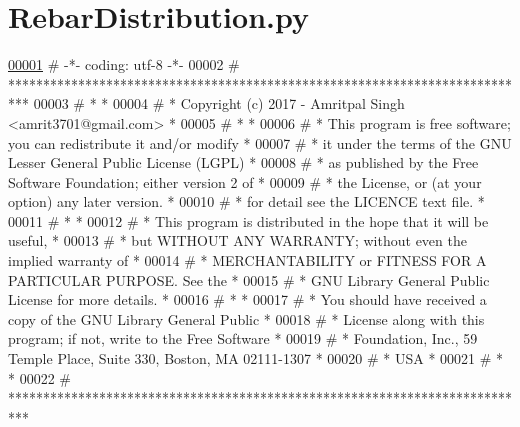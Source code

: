 \hypertarget{RebarDistribution_8py_source}{}\section{Rebar\+Distribution.\+py}

\begin{DoxyCode}
\hypertarget{RebarDistribution_8py_source.tex_l00001}{}\hyperlink{namespaceRebarDistribution}{00001} \textcolor{comment}{# -*- coding: utf-8 -*-}
00002 \textcolor{comment}{# ***************************************************************************}
00003 \textcolor{comment}{# *                                                                         *}
00004 \textcolor{comment}{# *   Copyright (c) 2017 - Amritpal Singh <amrit3701@gmail.com>             *}
00005 \textcolor{comment}{# *                                                                         *}
00006 \textcolor{comment}{# *   This program is free software; you can redistribute it and/or modify  *}
00007 \textcolor{comment}{# *   it under the terms of the GNU Lesser General Public License (LGPL)    *}
00008 \textcolor{comment}{# *   as published by the Free Software Foundation; either version 2 of     *}
00009 \textcolor{comment}{# *   the License, or (at your option) any later version.                   *}
00010 \textcolor{comment}{# *   for detail see the LICENCE text file.                                 *}
00011 \textcolor{comment}{# *                                                                         *}
00012 \textcolor{comment}{# *   This program is distributed in the hope that it will be useful,       *}
00013 \textcolor{comment}{# *   but WITHOUT ANY WARRANTY; without even the implied warranty of        *}
00014 \textcolor{comment}{# *   MERCHANTABILITY or FITNESS FOR A PARTICULAR PURPOSE.  See the         *}
00015 \textcolor{comment}{# *   GNU Library General Public License for more details.                  *}
00016 \textcolor{comment}{# *                                                                         *}
00017 \textcolor{comment}{# *   You should have received a copy of the GNU Library General Public     *}
00018 \textcolor{comment}{# *   License along with this program; if not, write to the Free Software   *}
00019 \textcolor{comment}{# *   Foundation, Inc., 59 Temple Place, Suite 330, Boston, MA  02111-1307  *}
00020 \textcolor{comment}{# *   USA                                                                   *}
00021 \textcolor{comment}{# *                                                                         *}
00022 \textcolor{comment}{# ***************************************************************************}

\end{DoxyCode}

